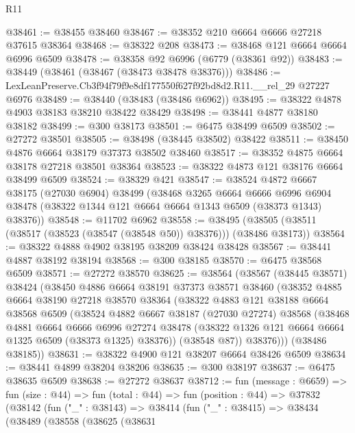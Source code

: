 \begin{lexlean}{R11}
\begin{coremodule}
@38461 := @38455 @38460
@38467 := @38352 @210 @6664 @6666 @27218 @37615 @38364
@38468 := @38322 @208
@38473 := @38468 @121 @6664 @6664 @6996 @6509
@38478 := @38358 @92 @6996 (@6779 (@38361 @92))
@38483 := @38449 (@38461 (@38467 (@38473 @38478 @38376)))
@38486 := LexLeanPreserve.Cb3f94f79f9e8df177550f627f92bd8d2.R11.__rel_29 @27227 @6976
@38489 := @38440 (@38483 (@38486 @6962))
@38495 := @38322 @4878 @4903 @38183 @38210 @38422 @38429
@38498 := @38441 @4877 @38180 @38182
@38499 := @300 @38173
@38501 := @6475 @38499 @6509
@38502 := @27272 @38501
@38505 := @38498 (@38445 @38502) @38422
@38511 := @38450 @4876 @6664 @38179 @37373 @38502 @38460
@38517 := @38352 @4875 @6664 @38178 @27218 @38501 @38364
@38523 := @38322 @4873 @121 @38176 @6664 @38499 @6509
@38524 := @38329 @421
@38547 := @38524
    @4872
    @6667
    @38175
    (@27030 @6904)
    @38499
    (@38468
      @3265
      @6664
      @6666
      @6996
      @6904
      @38478
      (@38322 @1344 @121 @6664 @6664 @1343 @6509 (@38373 @1343) @38376))
@38548 := @11702 @6962
@38558 := @38495 (@38505 (@38511 (@38517 (@38523 (@38547 (@38548 @50)) @38376))) (@38486 @38173))
@38564 := @38322 @4888 @4902 @38195 @38209 @38424 @38428
@38567 := @38441 @4887 @38192 @38194
@38568 := @300 @38185
@38570 := @6475 @38568 @6509
@38571 := @27272 @38570
@38625 := @38564
    (@38567
      (@38445 @38571)
      @38424
      (@38450
        @4886
        @6664
        @38191
        @37373
        @38571
        @38460
        (@38352
          @4885
          @6664
          @38190
          @27218
          @38570
          @38364
          (@38322
            @4883
            @121
            @38188
            @6664
            @38568
            @6509
            (@38524
              @4882
              @6667
              @38187
              (@27030 @27274)
              @38568
              (@38468
                @4881
                @6664
                @6666
                @6996
                @27274
                @38478
                (@38322 @1326 @121 @6664 @6664 @1325 @6509 (@38373 @1325) @38376))
              (@38548 @87))
            @38376)))
      (@38486 @38185))
@38631 := @38322 @4900 @121 @38207 @6664 @38426 @6509
@38634 := @38441 @4899 @38204 @38206
@38635 := @300 @38197
@38637 := @6475 @38635 @6509
@38638 := @27272 @38637
@38712 := fun (message : @6659) =>
  fun (size : @44) =>
  fun (total : @44) =>
  fun (position : @44) =>
  @37832
    (@38142
      (fun ("_" : @38143) =>
      @38414
        (fun ("_" : @38415) =>
        @38434
          (@38489
            (@38558
              (@38625
                (@38631

\end{coremodule}
\end{lexlean}
